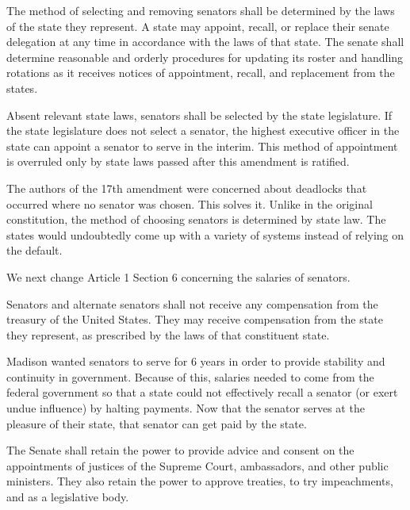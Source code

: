 \documentclass{article}
\begin{document}
\begin{quoting}
The method of selecting and removing senators shall be determined by the laws of the state they represent. A state may appoint, recall, or replace their senate delegation at any time in accordance with the laws of that state. The senate shall determine reasonable and orderly procedures for updating its roster and handling rotations as it receives notices of appointment, recall, and replacement from the states.

Absent relevant state laws, senators shall be selected by the state legislature. If the state legislature does not select a senator, the highest executive officer in the state can appoint a senator to serve in the interim. This method of appointment is overruled only by state laws passed after this amendment is ratified.
\end{quoting}

The authors of the 17th amendment were concerned about deadlocks that occurred where no senator was chosen. This solves it. Unlike in the original constitution, the method of choosing senators is determined by state law. The states would undoubtedly come up with a variety of systems instead of relying on the default.

We next change Article 1 Section 6 concerning the salaries of senators.

\begin{quoting}
Senators and alternate senators shall not receive any compensation from the treasury of the United States. They may receive compensation from the state they represent, as prescribed by the laws of that constituent state.
\end{quoting}

Madison wanted senators to serve for 6 years in order to provide stability and continuity in government.\cite{Senate} Because of this, salaries needed to come from the federal government so that a state could not effectively recall a senator (or exert undue influence) by halting payments. Now that the senator serves at the pleasure of their state, that senator can get paid by the state.

\begin{quoting}
The Senate shall retain the power to provide advice and consent on the appointments of justices of the Supreme Court, ambassadors, and other public ministers. They also retain the power to approve treaties, to try impeachments, and as a legislative body.
\end{quoting}
\end{document}
